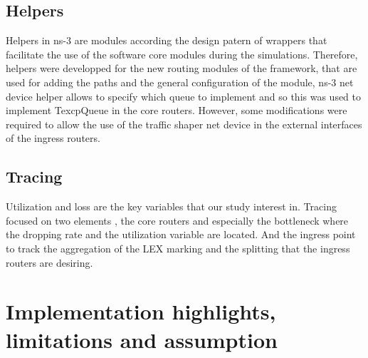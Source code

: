 \subsection{Helpers}
Helpers in ns-3 are modules according the design patern of wrappers that facilitate the use of the software core modules during the simulations. Therefore, helpers were developped for the new routing modules of the framework, that are used for adding the paths and the general configuration of the module, ns-3 net device helper allows to specify which queue to implement and so this was used to implement TexcpQueue in the core routers. However, some modifications were required to allow the use of the traffic shaper net device in the external interfaces of the ingress routers. 

\subsection{Tracing}

Utilization and loss are the key variables that our study interest in. Tracing focused on two elements , the core routers and especially the bottleneck where the dropping rate and the utilization variable are located. And the ingress point to track the aggregation of the LEX marking and the  splitting that the ingress routers are desiring.

\section{Implementation highlights, limitations and assumption}